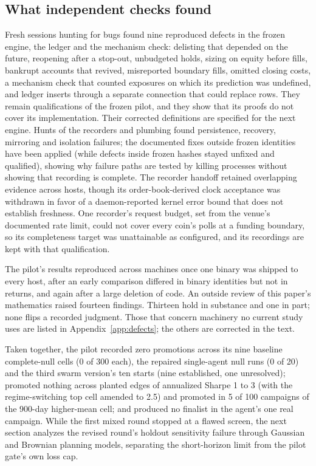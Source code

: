 \documentclass[11pt]{article}
\begin{document}
\subsection{What independent checks found}\label{sec:pilot-checks}

Fresh sessions hunting for bugs found nine reproduced defects in the frozen engine, the ledger and the mechanism check: delisting that depended on the future, reopening after a stop-out, unbudgeted holds, sizing on equity before fills, bankrupt accounts that revived, misreported boundary fills, omitted closing costs, a mechanism check that counted exposures on which its prediction was undefined, and ledger inserts through a separate connection that could replace rows. They remain qualifications of the frozen pilot, and they show that its proofs do not cover its implementation. Their corrected definitions are specified for the next engine. Hunts of the recorders and plumbing found persistence, recovery, mirroring and isolation failures; the documented fixes outside frozen identities have been applied (while defects inside frozen hashes stayed unfixed and qualified), showing why failure paths are tested by killing processes without showing that recording is complete. The recorder handoff retained overlapping evidence across hosts, though its order-book-derived clock acceptance was withdrawn in favor of a daemon-reported kernel error bound that does not establish freshness. One recorder's request budget, set from the venue's documented rate limit, could not cover every coin's polls at a funding boundary, so its completeness target was unattainable as configured, and its recordings are kept with that qualification.

The pilot's results reproduced across machines once one binary was shipped to every host, after an early comparison differed in binary identities but not in returns, and again after a large deletion of code. An outside review of this paper's mathematics raised fourteen findings. Thirteen hold in substance and one in part; none flips a recorded judgment. Those that concern machinery no current study uses are listed in Appendix~\ref{app:defects}; the others are corrected in the text.

Taken together, the pilot recorded zero promotions across its nine baseline complete-null cells (0 of 300 each), the repaired single-agent null runs (0 of 20) and the third swarm version's ten starts (nine established, one unresolved); promoted nothing across planted edges of annualized Sharpe 1 to 3 (with the regime-switching top cell amended to 2.5) and promoted in 5 of 100 campaigns of the 900-day higher-mean cell; and produced no finalist in the agent's one real campaign. While the first mixed round stopped at a flawed screen, the next section analyzes the revised round's holdout sensitivity failure through Gaussian and Brownian planning models, separating the short-horizon limit from the pilot gate's own loss cap.
\end{document}
